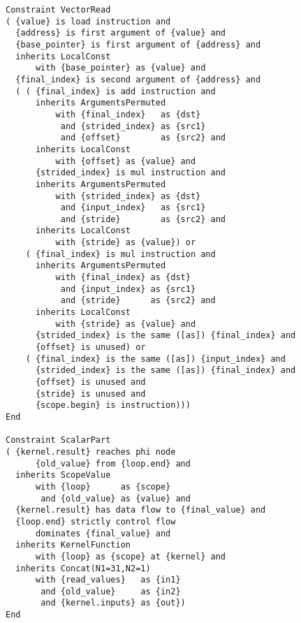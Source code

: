 \begin{figure}[p]
\begin{lstlisting}[language=IDL,basicstyle=\linespread{0.8}\ttfamily,
                   firstnumber=31]
Constraint VectorRead
( {value} is load instruction and
  {address} is first argument of {value} and
  {base_pointer} is first argument of {address} and
  inherits LocalConst
      with {base_pointer} as {value} and
  {final_index} is second argument of {address} and
  ( ( {final_index} is add instruction and
      inherits ArgumentsPermuted
          with {final_index}   as {dst}
           and {strided_index} as {src1}
           and {offset}        as {src2} and
      inherits LocalConst
          with {offset} as {value} and
      {strided_index} is mul instruction and
      inherits ArgumentsPermuted
          with {strided_index} as {dst}
           and {input_index}   as {src1}
           and {stride}        as {src2} and
      inherits LocalConst
          with {stride} as {value}) or 
    ( {final_index} is mul instruction and
      inherits ArgumentsPermuted
          with {final_index} as {dst}
           and {input_index} as {src1}
           and {stride}      as {src2} and
      inherits LocalConst
          with {stride} as {value} and
      {strided_index} is the same ([as]) {final_index} and
      {offset} is unused) or 
    ( {final_index} is the same ([as]) {input_index} and
      {strided_index} is the same ([as]) {final_index} and
      {offset} is unused and
      {stride} is unused and
      {scope.begin} is instruction)))
End

Constraint ScalarPart
( {kernel.result} reaches phi node
      {old_value} from {loop.end} and
  inherits ScopeValue
      with {loop}      as {scope}
       and {old_value} as {value} and 
  {kernel.result} has data flow to {final_value} and
  {loop.end} strictly control flow
      dominates {final_value} and
  inherits KernelFunction
      with {loop} as {scope} at {kernel} and
  inherits Concat(N1=31,N2=1)
      with {read_values}   as {in1}
       and {old_value}     as {in2}
       and {kernel.inputs} as {out})
End
\end{lstlisting}
\end{figure}
